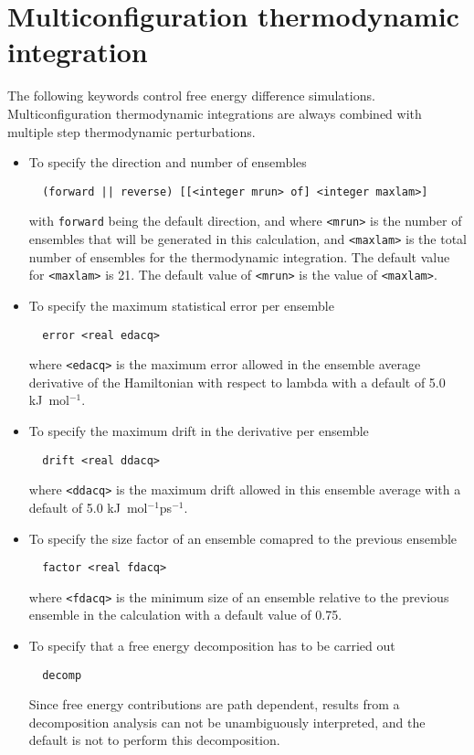 \section{Multiconfiguration thermodynamic integration}
The following keywords control free energy difference simulations.
Multiconfiguration thermodynamic integrations are always combined
with multiple step thermodynamic perturbations.
\begin{itemize}
\item
To specify the direction and number of ensembles
\begin{verbatim}
  (forward || reverse) [[<integer mrun> of] <integer maxlam>]
\end{verbatim}
with {\tt forward} being the default direction, and
where \verb+<mrun>+ is the number of ensembles that will be generated in
this calculation, and \verb+<maxlam>+ is the total number of ensembles
for the thermodynamic integration. The default value for \verb+<maxlam>+
is 21. The default value of \verb+<mrun>+ is the value of \verb+<maxlam>+.
\item
To specify the maximum statistical error per ensemble
\begin{verbatim}
  error <real edacq>
\end{verbatim}
where \verb+<edacq>+ is the maximum error allowed in the ensemble average 
derivative of the Hamiltonian with respect to lambda with a default
of 5.0 kJ~mol$^{-1}$.
\item
To specify the maximum drift in the derivative per ensemble
\begin{verbatim}
  drift <real ddacq>
\end{verbatim}
where \verb+<ddacq>+ is the maximum drift allowed in this
ensemble average with a default of 5.0 kJ~mol$^{-1}$ps$^{-1}$.
\item
To specify the size factor of an ensemble comapred to the previous
ensemble
\begin{verbatim}
  factor <real fdacq>
\end{verbatim}
where \verb+<fdacq>+ is the minimum size of an ensemble relative to the
previous ensemble in the calculation with a default value of 0.75.
\item
To specify that a free energy decomposition has to be carried out
\begin{verbatim}
  decomp
\end{verbatim}
Since free energy contributions are path dependent, results from a
decomposition analysis can not be unambiguously interpreted, and
the default is not to perform this decomposition.

\end{itemize}
